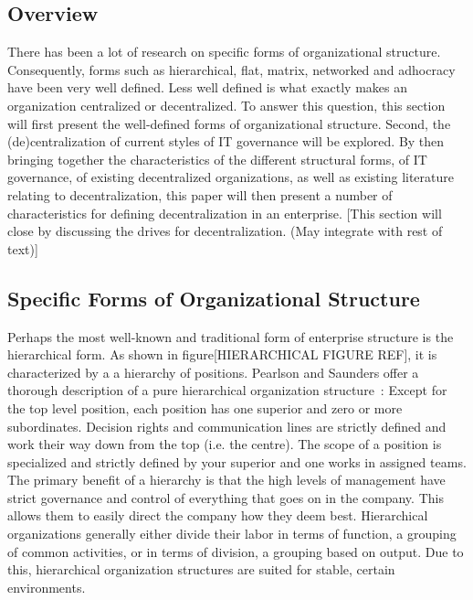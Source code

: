 \subsection{Overview}
There has been a lot of research on specific forms of organizational structure. Consequently, forms such as hierarchical, flat, matrix, networked and adhocracy have been very well defined. Less well defined is what exactly makes an organization centralized or decentralized. To answer this question, this section will first present the well-defined forms of organizational structure. Second, the (de)centralization of current styles of IT governance will be explored. By then bringing together the characteristics of the different structural forms, of IT governance, of existing decentralized organizations, as well as existing literature relating to decentralization, this paper will then present a number of characteristics for defining decentralization in an enterprise. [This section will close by discussing the drives for decentralization. (May integrate with rest of text)]

\subsection{Specific Forms of Organizational Structure}
\label{org:form}

Perhaps the most well-known and traditional form of enterprise structure is the hierarchical form. As shown in figure[HIERARCHICAL FIGURE REF], it is characterized by a a hierarchy of positions. Pearlson and Saunders offer a thorough description of a pure hierarchical organization structure~\cite{pearlson2009}: Except for the top level position, each position has one superior and zero or more subordinates. Decision rights and communication lines are strictly defined and work their way down from the top (i.e. the centre). The scope of a position is specialized and strictly defined by your superior and one works in assigned teams. The primary benefit of a hierarchy is that the high levels of management have strict governance and control of everything that goes on in the company. This allows them to easily direct the company how they deem best. Hierarchical organizations generally either divide their labor in terms of function, a grouping of common activities, or in terms of division, a grouping based on output. Due to this, hierarchical organization structures are suited for stable, certain environments. 

